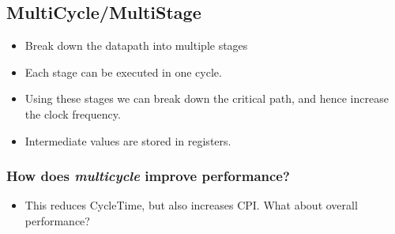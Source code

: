 \documentclass[10pt]{article}
\begin{document}
\subsection*{MultiCycle/MultiStage}
\begin{itemize}
    \item Break down the datapath into multiple stages
    \item Each stage can be executed in one cycle.
    \item Using these stages we can break down the critical path, and hence increase the clock frequency.
    \item Intermediate values are stored in registers.
\end{itemize}
\subsubsection*{How does \textit{multicycle} improve performance?}
\begin{itemize}
    \item This reduces CycleTime, but also increases CPI.  What about overall performance?
\end{itemize}
\end{document}
